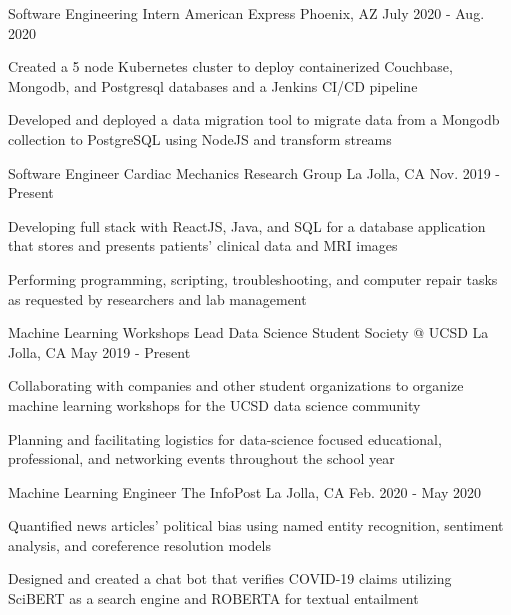 
\begin{cventries}   
  \cventry
    {Software Engineering Intern} %
    {American Express} %
    {Phoenix, AZ} %
    {July 2020 - Aug. 2020} %
    {
      \begin{cvitems} %
        \item {Created a 5 node Kubernetes cluster to deploy containerized Couchbase, Mongodb, and Postgresql databases and a Jenkins CI/CD pipeline}
        \item {Developed and deployed a data migration tool to migrate data from a Mongodb collection to PostgreSQL using NodeJS and transform streams}
      \end{cvitems}
    }
 
  \cventry
    {Software Engineer} %
    {Cardiac Mechanics Research Group} %
    {La Jolla, CA} %
    {Nov. 2019 - Present} %
    {
      \begin{cvitems} %
        \item {Developing full stack with ReactJS, Java, and SQL for a database application that stores and presents patients' clinical data and MRI images}
        \item {Performing programming, scripting, troubleshooting, and computer repair tasks as requested by researchers and lab management}
      \end{cvitems}
    }
  
  \cventry
    {Machine Learning Workshops Lead} %
    {Data Science Student Society @ UCSD} %
    {La Jolla, CA} %
    {May 2019 - Present} %
    {
      \begin{cvitems} %
        \item {Collaborating with companies and other student organizations to organize machine learning workshops for the UCSD data science community}
        \item {Planning and facilitating logistics for data-science focused educational, professional, and networking events throughout the school year}
      \end{cvitems}
    }

  \cventry
    {Machine Learning Engineer} %
    {The InfoPost} %
    {La Jolla, CA} %
    {Feb. 2020 - May 2020} %
    {
      \begin{cvitems} %
        \item {Quantified news articles' political bias using named entity recognition, sentiment analysis, and coreference resolution models}
        \item {Designed and created a chat bot that verifies COVID-19 claims utilizing SciBERT as a search engine and ROBERTA for textual entailment}
      \end{cvitems}
    }
    

\end{cventries}
